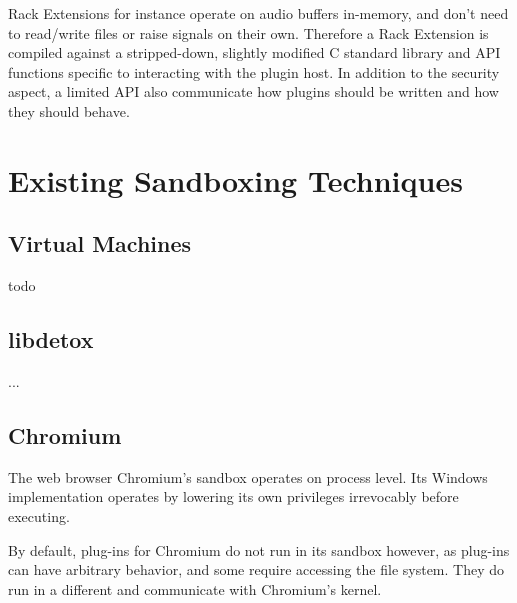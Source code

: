 Rack Extensions for instance operate on audio buffers in-memory, and don't need
to read/write files or raise signals on their own. Therefore a Rack Extension is
compiled against a stripped-down, slightly modified C standard library and API
functions specific to interacting with the plugin host. In addition to the
security aspect, a limited API also communicate how plugins should be written
and how they should behave.

\section {Existing Sandboxing Techniques}

\subsection {Virtual Machines}

todo

\subsection {libdetox}

...

\subsection {Chromium}

The web browser Chromium's sandbox operates on process level. Its Windows
implementation operates by lowering its own privileges irrevocably before
executing.

By default, plug-ins for Chromium do not run in its sandbox however, as
plug-ins can have arbitrary behavior, and some require accessing the file
system. They do run in a different and communicate with Chromium's kernel.

